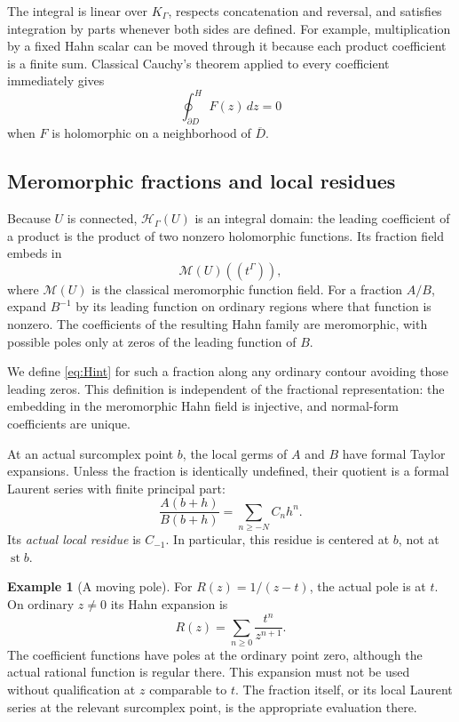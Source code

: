 \documentclass[11pt,a4paper]{article}
\theoremstyle{definition}
\newtheorem{example}[theorem]{Example}
\theoremstyle{remark}
\newcommand{\HH}{\mathcal H}
\newcommand{\st}{\operatorname{st}}
\newcommand{\Hoint}{\mathop{\oint}\nolimits^{\!H}}
\begin{document}
The integral is linear over $K_\Gamma$, respects concatenation and
reversal, and satisfies integration by parts whenever both sides are
defined. For example, multiplication by a fixed Hahn scalar can be
moved through it because each product coefficient is a finite sum.
Classical Cauchy's theorem applied to every coefficient immediately
gives
\[
 \Hoint_{\partial D}F(z)\,dz=0
\]
when $F$ is holomorphic on a neighborhood of $\overline D$.

\subsection{Meromorphic fractions and local residues}
Because $U$ is connected, $\HH_\Gamma(U)$ is an integral domain:
the leading coefficient of a product is the product of two nonzero
holomorphic functions. Its fraction field embeds in
\[
 \mathcal M(U)((t^\Gamma)),
\]
where $\mathcal M(U)$ is the classical meromorphic function field.
For a fraction $A/B$, expand $B^{-1}$ by its leading function on
ordinary regions where that function is nonzero. The coefficients of
the resulting Hahn family are meromorphic, with possible poles only
at zeros of the leading function of $B$.

We define \eqref{eq:Hint} for such a fraction along any ordinary
contour avoiding those leading zeros. This definition is independent
of the fractional representation: the embedding in the meromorphic
Hahn field is injective, and normal-form coefficients are unique.

At an actual surcomplex point $b$, the local germs of $A$ and $B$
have formal Taylor expansions. Unless the fraction is identically
undefined, their quotient is a formal Laurent series with finite
principal part:
\[
 \frac{A(b+h)}{B(b+h)}=\sum_{n\ge-N} C_nh^n.
\]
Its \emph{actual local residue} is $C_{-1}$. In particular, this
residue is centered at $b$, not at $\st b$.

\begin{example}[A moving pole]
For $R(z)=1/(z-t)$, the actual pole is at $t$. On ordinary
$z\ne0$ its Hahn expansion is
\[
 R(z)=\sum_{n\ge0}\frac{t^n}{z^{n+1}}.
\]
The coefficient functions have poles at the ordinary point zero,
although the actual rational function is regular there. This expansion
must not be used without qualification at $z$ comparable to $t$.
The fraction itself, or its local Laurent series at the relevant
surcomplex point, is the appropriate evaluation there.
\end{example}
\end{document}
